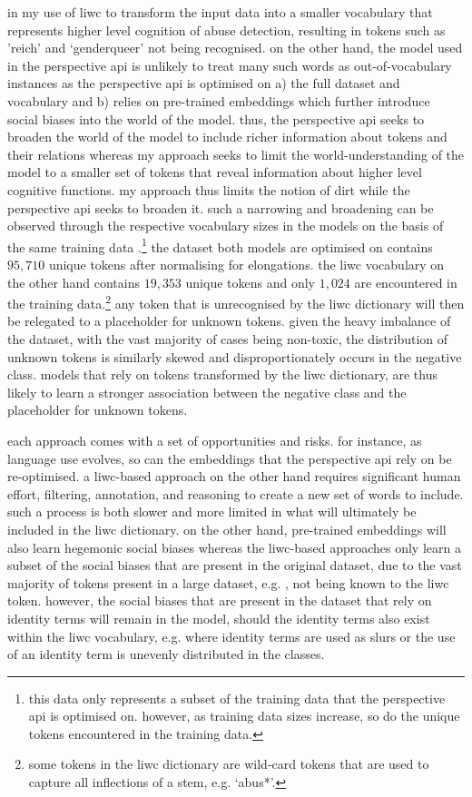 in my use of liwc to transform the input data into a smaller vocabulary that represents higher level cognition of abuse detection, resulting in tokens such as 'reich' and `genderqueer' not being recognised.
on the other hand, the model used in the perspective api is unlikely to treat many such words as out-of-vocabulary instances as the perspective api is optimised on a) the full dataset and vocabulary and b) relies on pre-trained embeddings which further introduce social biases into the world of the model.
thus, the perspective api seeks to broaden the world of the model to include richer information about tokens and their relations whereas my approach seeks to limit the world-understanding of the model to a smaller set of tokens that reveal information about higher level cognitive functions.
my approach thus limits the notion of dirt while the perspective api seeks to broaden it.
such a narrowing and broadening can be observed through the respective vocabulary sizes in the models on the basis of the same training data \citep{wulczyn:2017}.\footnote{this data only represents a subset of the training data that the perspective api is optimised on. however, as training data sizes increase, so do the unique tokens encountered in the training data.}
the dataset both models are optimised on contains $95,710$ unique tokens after normalising for elongations.
the liwc vocabulary on the other hand contains $19,353$ unique tokens and only $1,024$ are encountered in the training data.\footnote{some tokens in the liwc dictionary are wild-card tokens that are used to capture all inflections of a stem, e.g. `abus*'.}
any token that is unrecognised by the liwc dictionary will then be relegated to a placeholder for unknown tokens.
given the heavy imbalance of the dataset, with the vast majority of cases being non-toxic, the distribution of unknown tokens is similarly skewed and disproportionately occurs in the negative class.
models that rely on tokens transformed by the liwc dictionary, are thus likely to learn a stronger association between the negative class and the placeholder for unknown tokens.

each approach comes with a set of opportunities and risks.
for instance, as language use evolves, so can the embeddings that the perspective api rely on be re-optimised.
a liwc-based approach on the other hand requires significant human effort, filtering, annotation, and reasoning to create a new set of words to include.
such a process is both slower and more limited in what will ultimately be included in the liwc dictionary.
on the other hand, pre-trained embeddings will also learn hegemonic social biases \citep{bender:2021} whereas the liwc-based approaches only learn a subset of the social biases that are present in the original dataset, due to the vast majority of tokens present in a large dataset, e.g. \citep{wulczyn:2017}, not being known to the liwc token. 
however, the social biases that are present in the dataset that rely on identity terms will remain in the model, should the identity terms also exist within the liwc vocabulary, e.g. where identity terms are used as slurs or the use of an identity term is unevenly distributed in the classes.

